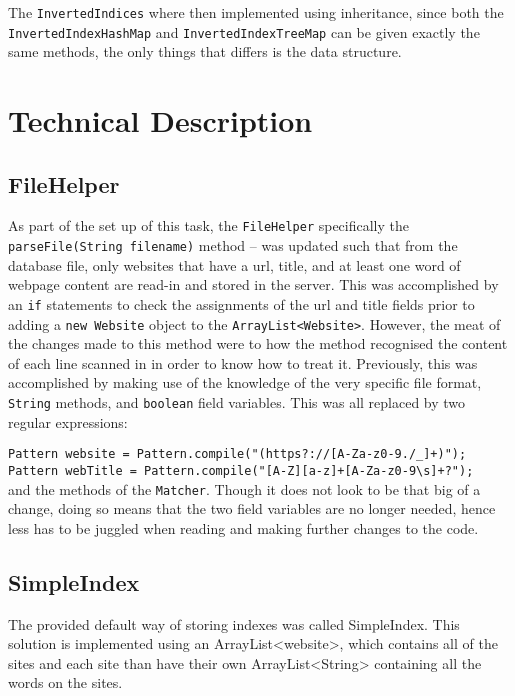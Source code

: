 The {\tt InvertedIndices} where then implemented using inheritance, since both the {\tt InvertedIndexHashMap} and {\tt InvertedIndexTreeMap} can be given exactly the same methods, the only things that differs is the data structure.

\section{Technical Description}
\subsection{FileHelper}
As part of the set up of this task, the {\tt FileHelper} specifically the \\ {\tt parseFile(String filename)} method – was updated such that from the database file, only websites that have a url, title, and at least one word of webpage content are read-in and stored in the server.
This was accomplished by an {\tt if} statements to check the assignments of the url and title fields prior to adding a {\tt new Website} object to the {\tt ArrayList<Website>}. However, the meat of the changes made to this method were to how the method recognised the content of each line scanned in in order to know how to treat it.
Previously, this was accomplished by making use of the knowledge of the very specific file format, {\tt String} methods, and {\tt boolean} field variables.
This was all replaced by two regular expressions:

{\tt Pattern website = Pattern.compile("(https?://[A-Za-z0-9./\_]+)");} \\
{\tt Pattern webTitle = Pattern.compile("[A-Z][a-z]+[A-Za-z0-9\textbackslash s]+?");} \\

and the methods of the {\tt Matcher}. Though it does not look to be that big of a change, doing so means that the two field variables are no longer needed, hence less has to be juggled when reading and making further changes to the code.

\subsection{SimpleIndex}
The provided default way of storing indexes was called SimpleIndex. This solution is implemented using an ArrayList<website>, which contains all of the sites and each site than have their own ArrayList<String>  containing all the words on the sites. \\

